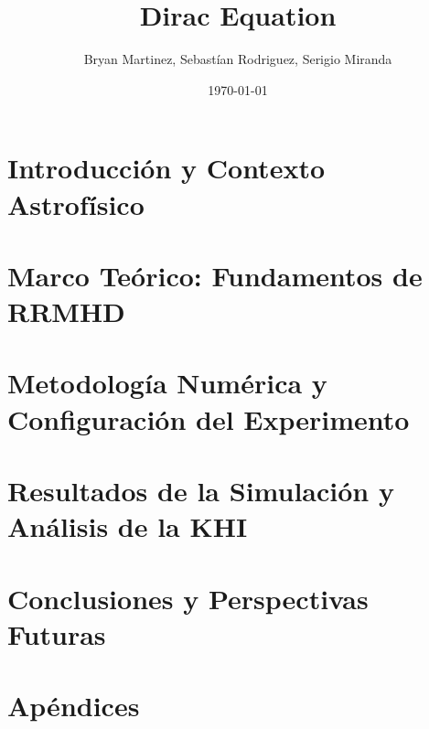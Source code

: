 \documentclass[11pt, english]{scrbook}
\title{Dirac Equation}
\author{Bryan Martinez, Sebastían Rodriguez, Serigio Miranda}
\date{\today}
\begin{document}
\frontmatter
\maketitle
\tableofcontents

\mainmatter




 


\chapter{Introducción y Contexto Astrofísico}
\label{ch:intro}


\chapter{Marco Teórico: Fundamentos de RRMHD}
\label{ch:rrmhd_theory}


\chapter{Metodología Numérica y Configuración del Experimento}
\label{ch:numerical_methods}


\chapter{Resultados de la Simulación y Análisis de la KHI}
\label{ch:results_discussion}


\chapter{Conclusiones y Perspectivas Futuras}
\label{ch:conclusions}


\appendix
\chapter{Apéndices}













\backmatter

\printbibliography %
\end{document}
